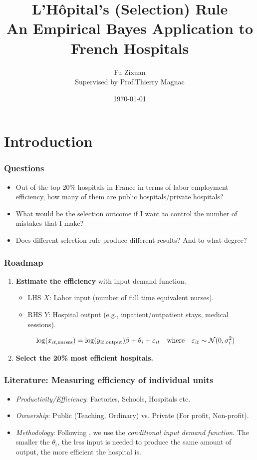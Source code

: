 \documentclass[10pt,mathserif,aspectratio=169]{beamer}
\title{\large \bfseries L'Hôpital's (Selection) Rule\\
  An Empirical Bayes Application to French Hospitals}
\author{Fu Zixuan\\[3ex]
  Supervised by Prof.Thierry Magnac}
\date{\today}
\begin{document}
\frame{
  \thispagestyle{empty}
  \titlepage
}

\section{Introduction}

\begin{frame}
  \frametitle{Questions}
  \begin{itemize}\itemsep=12pt
    \item Out of the top 20\% hospitals in France in terms of labor employment
          efficiency, how many of them are public hospitals/private hospitals?
    \item What would be the selection outcome if I want to control the number of mistakes
          that I make?
    \item Does different selection rule produce different results? And to what degree?
  \end{itemize}
\end{frame}

\begin{frame}
  \frametitle{Roadmap}
  \begin{enumerate}\itemsep=12pt
    \item \textbf{Estimate the efficiency} with input demand function.
          \begin{itemize} \itemsep=8pt
            \item LHS $X$: Labor input (number of full time equivalent nurses).
            \item RHS $Y$: Hospital output (e.g., inpatient/outpatient stays, medical sessions).
          \end{itemize}
          \begin{equation*}
            \log(x_{it,\text{nurses}}) = \log(y_{it,\text{output}})\beta +\theta_i +\varepsilon_{it} \quad \text{where}\quad \varepsilon_{it} \sim \mathcal{N}(0,\sigma_i^2)
          \end{equation*}
    \item \textbf{Select the 20\% most efficient hospitals.}

  \end{enumerate}
\end{frame}

\begin{frame}[label=literature]
  \frametitle{Literature: Measuring efficiency of individual units}
  \begin{itemize}\itemsep=12pt

    \item \textit{Productivity/Efficiency}: Factories, Schools, Hospitals etc.
    \item \textit{Ownership}: Public (Teaching, Ordinary) vs. Private (For profit, Non-profit).
    \item \textit{Methodology}: Following \citet{croiset2024hospitals}, we use the \textit{conditional input demand function}.
          The smaller the $\theta_i$, the less input is needed to produce the same amount
          of output, the more efficient the hospital is.\hyperlink{inputdemand}{}
  \end{itemize}
\end{frame}
\end{document}
